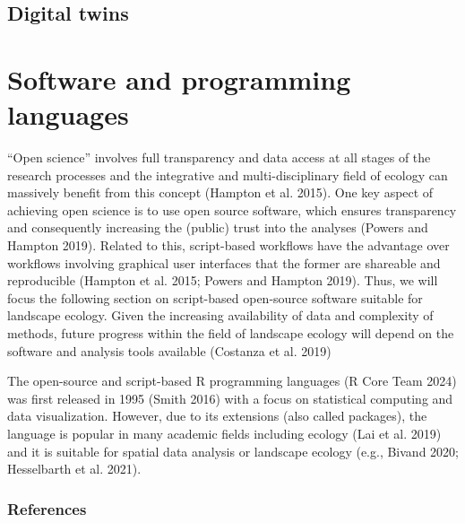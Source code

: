 \documentclass[
  10pt,
  a4paperpaper,
]{article}
\begin{document}
\subsection{Digital twins}\label{digital-twins}

\section{Software and programming
languages}\label{software-and-programming-languages}

``Open science'' involves full transparency and data access at all
stages of the research processes and the integrative and
multi-disciplinary field of ecology can massively benefit from this
concept (Hampton et al. 2015). One key aspect of achieving open science
is to use open source software, which ensures transparency and
consequently increasing the (public) trust into the analyses (Powers and
Hampton 2019). Related to this, script-based workflows have the
advantage over workflows involving graphical user interfaces that the
former are shareable and reproducible (Hampton et al. 2015; Powers and
Hampton 2019). Thus, we will focus the following section on script-based
open-source software suitable for landscape ecology. Given the
increasing availability of data and complexity of methods, future
progress within the field of landscape ecology will depend on the
software and analysis tools available (Costanza et al. 2019)

The open-source and script-based R programming languages (R Core Team
2024) was first released in 1995 (Smith 2016) with a focus on
statistical computing and data visualization. However, due to its
extensions (also called packages), the language is popular in many
academic fields including ecology (Lai et al. 2019) and it is suitable
for spatial data analysis or landscape ecology (e.g., Bivand 2020;
Hesselbarth et al. 2021).

\newpage{}

\subsubsection*{References}\label{references}

\begingroup
\raggedright
\end{document}
